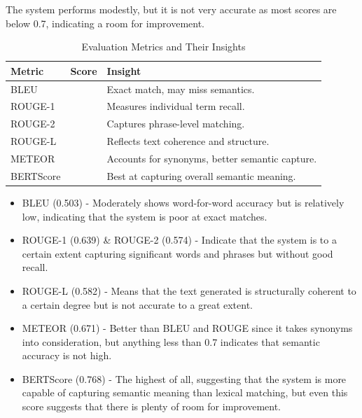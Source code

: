 The system performs modestly, but it is not very accurate as most scores are below 0.7, indicating a room for improvement. \\ 
\begin{table}[h!]
    \renewcommand{\arraystretch}{1.2}
   \begin{tabularx}{\columnwidth}{|>{\hsize=0.4\hsize}X| >{\hsize=0.3\hsize}X| >{\raggedright\arraybackslash\hsize=1.3\hsize}X|}
        \hline
         \textbf{Metric} & \textbf{Score} & \textbf{Insight} \\
        \hline
        BLEU & 0.503 & Exact match, may miss semantics. \\
        \hline
        ROUGE-1 & 0.639 & Measures individual term recall. \\
        \hline
        ROUGE-2 & 0.574 & Captures phrase-level matching. \\
        \hline
        ROUGE-L & 0.582 & Reflects text coherence and structure. \\
        \hline
        METEOR & 0.671 & Accounts for synonyms, better semantic capture. \\
        \hline
        BERTScore & 0.768 & Best at capturing overall semantic meaning. \\
        \hline
    \end{tabularx}
    \vspace{10pt}
    \caption{Evaluation Metrics and Their Insights}
    \label{tab:metrics}
\end{table}
\begin{itemize}
    \item BLEU (0.503) - Moderately shows word-for-word accuracy but is relatively low, indicating that the system is poor at exact matches. \\
    \item ROUGE-1 (0.639) \& ROUGE-2 (0.574) - Indicate that the system is to a certain extent capturing significant words and phrases but without good recall. \\
    \item ROUGE-L (0.582) - Means that the text generated is structurally coherent to a certain degree but is not accurate to a great extent. \\
    \item METEOR (0.671) - Better than BLEU and ROUGE since it takes synonyms into consideration, but anything less than 0.7 indicates that semantic accuracy is not high. \\
    \item BERTScore (0.768) - The highest of all, suggesting that the system is more capable of capturing semantic meaning than lexical matching, but even this score suggests that there is plenty of room for improvement. \\
\end{itemize}
